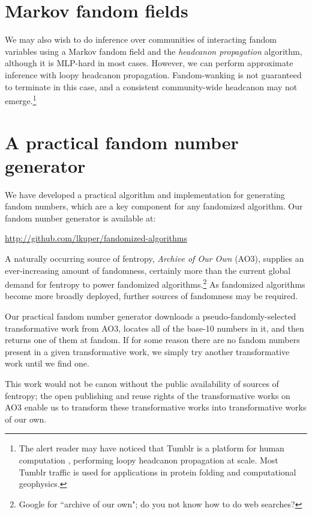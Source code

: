 \documentclass[9pt]{sigplanconf}
\begin{document}
\section{Markov fandom fields}
We may also wish to do inference over communities of interacting
fandom variables using a Markov fandom field and the \emph{headcanon
  propagation} algorithm, although it is MLP-hard in most cases.
However, we can perform approximate inference with loopy headcanon
propagation.  Fandom-wanking is not guaranteed to terminate in this
case, and a consistent community-wide headcanon may not
emerge.\footnote{The alert reader may have noticed that Tumblr is a
  platform for human computation \cite{luisvonahn}, performing loopy
  headcanon propagation at scale. Most Tumblr traffic is used for
  applications in protein folding and computational geophysics.}

\section{A practical fandom number generator}
We have developed a practical algorithm and implementation for
generating fandom numbers, which are a key component for any
fandomized algorithm. Our fandom number generator is available at:
\begin{center}
\url{http://github.com/lkuper/fandomized-algorithms}
\end{center}
\noindent A naturally occurring source of fentropy, \textit{Archive of
  Our Own} (AO3), supplies an ever-increasing amount of fandomness,
certainly more than the current global demand for fentropy to power
fandomized algorithms.\footnote{Google for ``archive of our own"; do
  you not know how to do web searches?\footnotemark} As fandomized algorithms become more broadly
deployed, further sources of fandomness may be required.

Our practical fandom number generator downloads a
pseudo-fandomly-selected transformative work from AO3, locates all of
the base-10 numbers in it, and then returns one of them at fandom. If
for some reason there are no fandom numbers present in a given
transformative work, we simply try another transformative work until
we find one.

This work would not be canon without the public availability of
sources of fentropy; the open publishing and reuse rights of the
transformative works on AO3 enable us to transform these
transformative works into transformative works of our own.
\end{document}
